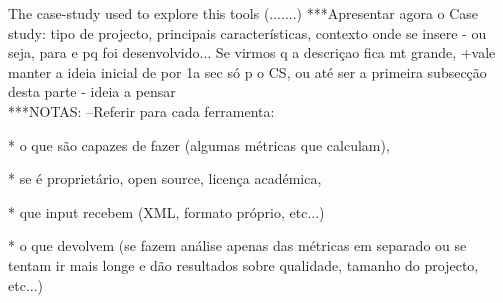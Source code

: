 The case-study used to explore this tools (.......)
***Apresentar agora o Case study: tipo de projecto, principais características, contexto onde se insere - ou seja, para e pq foi desenvolvido... Se virmos q a descriçao fica mt grande, +vale manter a ideia inicial de por 1a sec só p o CS, ou até ser a primeira subsecção desta parte - ideia a pensar\\

***NOTAS:
--Referir para cada ferramenta:

* o que são capazes de fazer (algumas métricas que calculam),

* se é proprietário, open source, licença académica,

* que input recebem (XML, formato próprio, etc...)

* o que devolvem (se fazem análise apenas das métricas em separado ou se tentam ir mais longe e dão resultados sobre qualidade, tamanho do projecto, etc...)